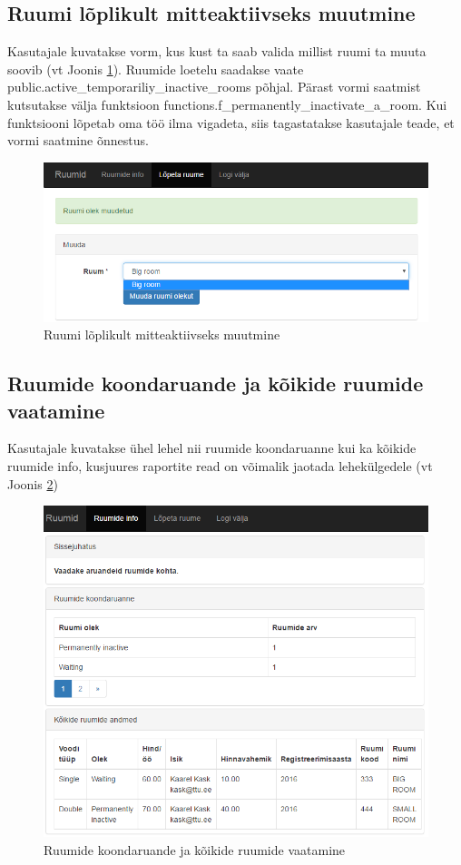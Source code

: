 \documentclass[a4paper,12pt]{article} %
\begin{document}
\subsection{Ruumi lõplikult mitteaktiivseks muutmine}
Kasutajale kuvatakse vorm, kus kust ta saab valida millist ruumi ta muuta soovib (vt Joonis \ref{fig_näidisrakendus_vorm}). Ruumide loetelu saadakse vaate  public.active\_temporariliy\_inactive\_rooms põhjal. Pärast vormi saatmist kutsutakse välja funktsioon functions.f\_permanently\_inactivate\_a\_room. Kui funktsiooni lõpetab oma töö ilma vigadeta, siis tagastatakse kasutajale teade, et vormi saatmine õnnestus.
\begin{figure}[H]
\centering
\includegraphics[width=\textwidth]{./diagrams/sample-app-form.png}
\caption{Ruumi lõplikult mitteaktiivseks muutmine}
\label{fig_näidisrakendus_vorm}
\end{figure}
\subsection{Ruumide koondaruande ja kõikide ruumide vaatamine}
Kasutajale kuvatakse ühel lehel nii ruumide koondaruanne kui ka kõikide ruumide info, kusjuures raportite read on võimalik jaotada lehekülgedele (vt Joonis \ref{fig_näidisrakendus_raportid})
\begin{figure}[H]
\centering
\includegraphics[width=\textwidth]{./diagrams/sample-app-reports.png}
\caption{Ruumide koondaruande ja kõikide ruumide vaatamine}
\label{fig_näidisrakendus_raportid}
\end{figure}
\end{document}
